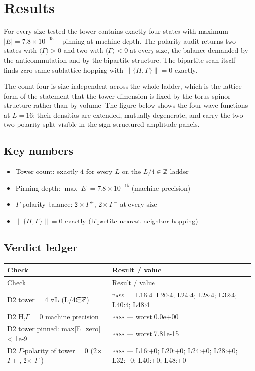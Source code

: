 \documentclass[11pt,a4paper]{article}
\begin{document}
\section{Results}
For every size tested the tower contains exactly four states with maximum $|E| = 7.8\times10^{-15}$ -- pinning at machine depth. The polarity audit returns two states with $\langle\Gamma\rangle > 0$ and two with $\langle\Gamma\rangle < 0$ at every size, the balance demanded by the anticommutation and by the bipartite structure. The bipartite scan itself finds zero same-sublattice hopping with $\|\{H, \Gamma\}\| = 0$ exactly.

The count-four is size-independent across the whole ladder, which is the lattice form of the statement that the tower dimension is fixed by the torus spinor structure rather than by volume. The figure below shows the four wave functions at $L = 16$: their densities are extended, mutually degenerate, and carry the two-two polarity split visible in the sign-structured amplitude panels.

\subsection{Key numbers}
\begin{tcolorbox}[colback=labblue!6, colframe=labblue!70!black, boxrule=0.6pt, title={Key results (canonical run)}]
\begin{itemize}[leftmargin=1.2em, itemsep=0.15em]
\item Tower count: exactly $4$ for every $L$ on the $L/4 \in \mathbb{Z}$ ladder
\item Pinning depth: $\max|E| = 7.8\times10^{-15}$ (machine precision)
\item $\Gamma$-polarity balance: $2 \times \Gamma^+$, $2 \times \Gamma^-$ at every size
\item $\|\{H,\Gamma\}\| = 0$ exactly (bipartite nearest-neighbor hopping)
\end{itemize}
\end{tcolorbox}

\subsection{Verdict ledger}
\begin{longtable}{@{}p{}p{}@{}}
\toprule
Check & Result / value \\
\midrule
\endfirsthead
\toprule
Check & Result / value \\
\midrule
\endhead
\bottomrule
\endfoot
D2 tower = 4 $\forall$L (L/4∈ℤ) & \textsc{pass} --- L16:4; L20:4; L24:4; L28:4; L32:4; L40:4; L48:4 \\
D2 {H,$\Gamma$} = 0 machine precision & \textsc{pass} --- worst 0.0e+00 \\
D2 tower pinned: max|E\_zero| < 1e-9 & \textsc{pass} --- worst 7.81e-15 \\
D2 $\Gamma$-polarity of tower = 0 (2$\times$ $\Gamma$+ , 2$\times$ $\Gamma$-) & \textsc{pass} --- L16:+0; L20:+0; L24:+0; L28:+0; L32:+0; L40:+0; L48:+0 \\
\end{longtable}
\end{document}
